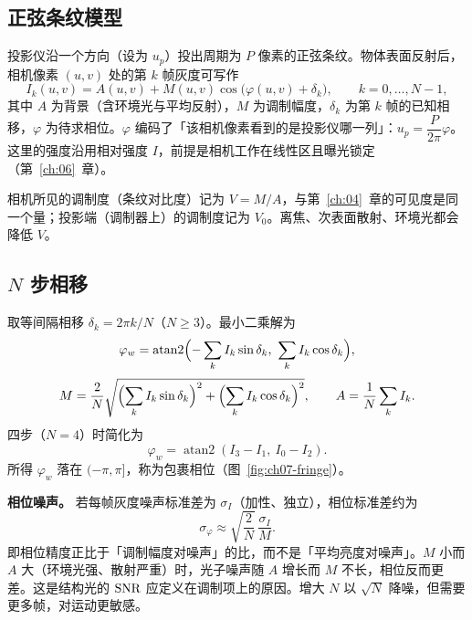 \subsection{正弦条纹模型}

投影仪沿一个方向（设为 $u_p$）投出周期为 $P$ 像素的正弦条纹。物体表面反射后，相机像素 $(u,v)$ 处的第 $k$ 帧灰度可写作
\begin{equation}
  I_k(u,v)=A(u,v)+M(u,v)\cos\!\bigl(\varphi(u,v)+\delta_k\bigr),\qquad k=0,\dots,N-1,
  \label{eq:ch07-fringe}
\end{equation}
其中 $A$ 为背景（含环境光与平均反射），$M$ 为调制幅度，$\delta_k$ 为第 $k$ 帧的已知相移，$\varphi$ 为待求相位。$\varphi$ 编码了「该相机像素看到的是投影仪哪一列」：$u_p=\dfrac{P}{2\pi}\varphi$。这里的强度沿用相对强度 $I$，前提是相机工作在线性区且曝光锁定（第~\ref{ch:06}~章）。

相机所见的调制度（条纹对比度）记为 $V=M/A$，与第~\ref{ch:04}~章的可见度是同一个量；投影端（调制器上）的调制度记为 $V_0$。离焦、次表面散射、环境光都会降低 $V$。

\subsection{$N$ 步相移}

取等间隔相移 $\delta_k=2\pi k/N$（$N\ge3$）。最小二乘解为
\begin{equation}
  \varphi_w=\operatorname{atan2}\Bigl(-\sum_{k}I_k\sin\delta_k,\ \sum_{k}I_k\cos\delta_k\Bigr),
  \label{eq:ch07-nstep}
\end{equation}
\begin{equation}
  M=\frac{2}{N}\sqrt{\Bigl(\sum_k I_k\sin\delta_k\Bigr)^2+\Bigl(\sum_k I_k\cos\delta_k\Bigr)^2},
  \qquad
  A=\frac{1}{N}\sum_k I_k.
  \label{eq:ch07-AM}
\end{equation}
四步（$N=4$）时简化为
\[
  \varphi_w=\operatorname{atan2}(I_3-I_1,\ I_0-I_2).
\]
所得 $\varphi_w$ 落在 $(-\pi,\pi]$，称为包裹相位（图~\ref{fig:ch07-fringe}）。

\textbf{相位噪声。} 若每帧灰度噪声标准差为 $\sigma_I$（加性、独立），相位标准差约为
\begin{equation}
  \sigma_{\varphi}\approx\sqrt{\frac{2}{N}}\,\frac{\sigma_I}{M}.
  \label{eq:ch07-phase-noise}
\end{equation}
即相位精度正比于「调制幅度对噪声」的比，而不是「平均亮度对噪声」。$M$ 小而 $A$ 大（环境光强、散射严重）时，光子噪声随 $A$ 增长而 $M$ 不长，相位反而更差。这是结构光的 $\mathrm{SNR}$ 应定义在调制项上的原因。增大 $N$ 以 $\sqrt{N}$ 降噪，但需要更多帧，对运动更敏感。

